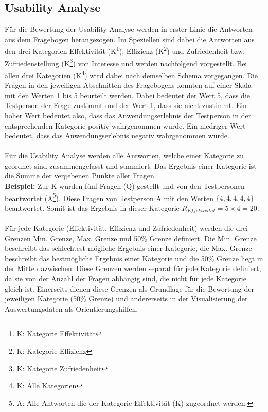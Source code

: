 \documentclass[Bachelorarbeit.tex]{subfiles}
\begin{document}
\subsection{Usability Analyse}
\label{ergebnis_usability}
Für die Bewertung der Usability Analyse werden in erster Linie die Antworten aus dem Fragebogen herangezogen.
Im Speziellen sind dabei die Antworten aus den drei Kategorien Effektivität (K\footnote{K: Kategorie Effektivität}), Effizienz (K\footnote{K: Kategorie Effizienz}) und Zufriedenheit bzw. Zufriedenstellung (K\footnote{K: Kategorie Zufriedenheit}) von Interesse und werden nachfolgend vorgestellt.
Bei allen drei Kategorien (K\footnote{K: Alle Kategorien}) wird dabei nach demselben Schema vorgegangen. 
Die Fragen in den jeweiligen Abschnitten des Fragebogens konnten auf einer Skala mit den Werten 1 bis 5 beurteilt werden. 
Dabei bedeutet der Wert 5, dass die Testperson der Frage zustimmt und der Wert 1, dass sie nicht zustimmt. 
Ein hoher Wert bedeutet also, dass das  Anwendungserlebnis der Testperson in der entsprechenden Kategorie positiv wahrgenommen wurde. 
Ein niedriger Wert bedeutet, dass das Anwendungserlebnis negativ wahrgenommen wurde.\\
\\
Für die Usability Analyse werden alle Antworten, welche einer Kategorie zu geordnet sind zusammengefasst und summiert. Das Ergebnis einer Kategorie ist die Summe der vergebenen Punkte aller Fragen.
\\
\textbf{Beispiel:} 
Zur K wurden fünf Fragen (Q) gestellt und von den Testpersonen beantwortet (A\footnote{A: Alle Antworten die der Kategorie Effektivität (K) zugeordnet werden.}).
Diese Fragen von Testperson A mit den Werten $\lbrace 4,4,4,4,4 \rbrace$ beantwortet. Somit ist das Ergebnis in dieser Kategorie $R_{Effektivit\ddot{a}t}=5 \times 4=20$.\\
\\
Für jede Kategorie (Effektivität, Effizienz und Zufriedenheit) werden die drei Grenzen Min. Grenze, Max. Grenze und 50\% Grenze definiert. Die Min. Grenze beschreibt das schlechtest mögliche Ergebnis einer Kategorie, die Max. Grenze beschreibt das bestmögliche Ergebnis einer Kategorie und die 50\% Grenze liegt in der Mitte dazwischen. Diese Grenzen werden separat für jede Kategorie definiert, da sie von der Anzahl der Fragen abhängig sind, die nicht für jede Kategorie gleich ist. 
Einerseits dienen diese Grenzen als Grundlage für die Bewertung der jeweiligen Kategorie (50\% Grenze) und andererseits in der Visualisierung der Auswertungsdaten als Orientierungshilfen.
\end{document}
